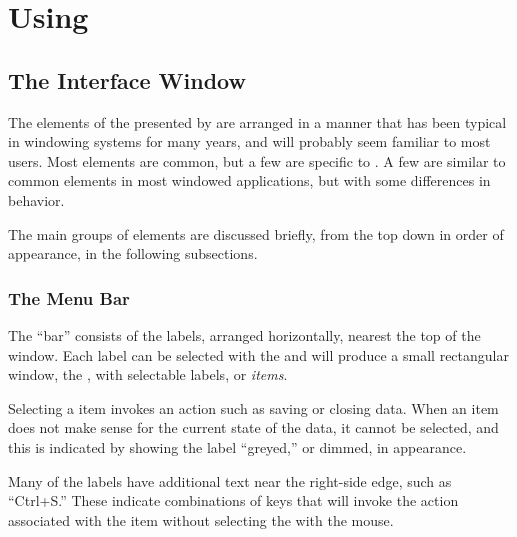\chapter{Using \dtypkgu{}}

	\section{The Interface Window}%
	The elements of the  presented by \IXpkg{}
	are arranged in a manner that has been typical in
	windowing systems for many years, and will probably
	seem familiar to most users. Most elements are common,
	but a few are specific to \IXpkg{}. A few are similar
	to common elements in most windowed applications,
	but with some differences in behavior.

	The main groups of  elements are
	discussed briefly, from the top down in order of appearance,
	in the following subsections.
		\subsection{The Menu Bar}%
		The  ``bar'' consists of the labels, arranged
		horizontally, nearest the top of the window. Each
		label can be selected with the  and
		will produce a small rectangular window, the
		, with selectable labels, or
		\emph{items}.
		
		Selecting a  item invokes an action
		such as saving or closing data. When an item does not
		make sense for the current state of the data, it
		cannot be selected, and this is indicated by showing the
		label ``greyed,'' or dimmed, in appearance.
		
		Many of the  labels have additional text
		near the right-side edge, such as ``Ctrl+S.''  These
		indicate combinations of keys that will invoke the
		action associated with the  item without
		selecting the  with the mouse.

